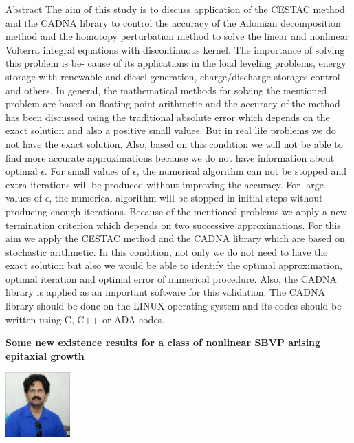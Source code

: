 \documentclass[twoside,11pt]{amsart}
\begin{document}
\vskip 8mm
Abstract
The aim of this study is to discuss application of the CESTAC method and the CADNA library to control the accuracy of the Adomian decomposition method and the homotopy perturbation method to solve the linear and nonlinear Volterra integral equations with discontinuous kernel. The importance of solving this problem is be- cause of its applications in the load leveling problems, energy storage with renewable and diesel generation, charge/discharge storages control and others.
In general, the mathematical methods for solving the mentioned problem are based on floating point arithmetic and the accuracy of the method has been discussed using the traditional absolute error which depends on the exact solution and also a positive small value$\epsilon$. But in real life problems we do not have the exact solution. Also, based on this condition we will not be able to find more accurate approximations because we do not have information about optimal $\epsilon$. For small values of $\epsilon$, the numerical algorithm can not be stopped and extra iterations will be produced without improving the accuracy. For large values of $\epsilon$, the numerical algorithm will be stopped in initial steps without producing enough iterations.
Because of the mentioned problems we apply a new termination criterion which depends on two successive approximations. For this aim we apply the CESTAC method and the CADNA library which are based on stochastic arithmetic. In this condition, not only we do not need to have the exact solution but also we would be able to identify the optimal approximation, optimal iteration and optimal error of numerical procedure. Also, the CADNA library is applied as an important software for this validation. The CADNA library should be done on the LINUX operating system and its codes should be written using C, C++ or ADA codes.
\begin{flushleft}
{\bf }
\end{flushleft}
\newpage

\vskip 10mm
\begin{center}\bf\LARGE
Some new existence results for a class of nonlinear SBVP arising epitaxial growth
\end{center}
\vskip 5mm
\begin{center}
\includegraphics[width=2.5cm, height=2.5cm, keepaspectratio=false]{AKV2.jpg}
\end{center}
\vskip 2mm
\end{document}
